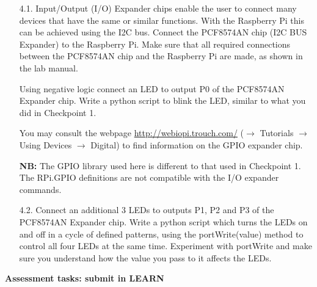 \begin{enumerate}


\item [4.1.] Input/Output (I/O) Expander chips enable the user to connect many devices that have the same or similar functions.
With the Raspberry Pi this can be achieved using the I2C bus.
Connect the PCF8574AN chip  (I2C BUS Expander) to the Raspberry Pi.
Make sure that all required connections between the PCF8574AN chip and the Raspberry Pi are made, as shown in the lab manual.

Using negative logic connect an LED to output P0 of the PCF8574AN Expander chip. 
Write a python script to blink the LED, similar to what you did in Checkpoint 1.

You may consult the \webiopi webpage \url{http://webiopi.trouch.com/} ($\rightarrow$ Tutorials $\rightarrow$ Using Devices $\rightarrow$ Digital) to find information on the GPIO expander chip.

{\bf NB:} The GPIO library used here is different to that used in Checkpoint 1.
The RPi.GPIO definitions are not compatible with the \webiopi I/O expander commands. \\



\item [4.2.] Connect an additional 3 LEDs to outputs P1, P2 and P3 of the PCF8574AN Expander chip.
Write a python script which turns the LEDs on and off in a cycle of defined patterns, using the portWrite(value) method to control all four LEDs at the same time.
Experiment with portWrite and make sure you understand how the value you pass to it affects the LEDs.


%

\end{enumerate}

\newpage
{\bf Assessment tasks: submit in LEARN}

